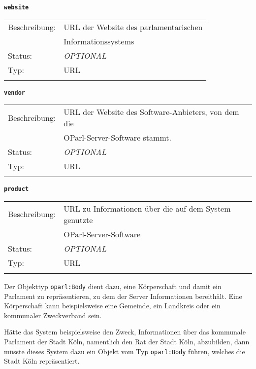 \documentclass[,a4paper]{article}
\begin{document}
\textbf{\texttt{website}}

\begin{longtable}[c]{@{}ll@{}}
\toprule\addlinespace
Beschreibung: & URL der Website des parlamentarischen
\\\addlinespace
& Informationssystems
\\\addlinespace
Status: & \emph{OPTIONAL}
\\\addlinespace
Typ: & URL
\\\addlinespace
\bottomrule
\end{longtable}

\textbf{\texttt{vendor}}

\begin{longtable}[c]{@{}ll@{}}
\toprule\addlinespace
Beschreibung: & URL der Website des Software-Anbieters, von dem die
\\\addlinespace
& OParl-Server-Software stammt.
\\\addlinespace
Status: & \emph{OPTIONAL}
\\\addlinespace
Typ: & URL
\\\addlinespace
\bottomrule
\end{longtable}

\textbf{\texttt{product}}

\begin{longtable}[c]{@{}ll@{}}
\toprule\addlinespace
Beschreibung: & URL zu Informationen über die auf dem System genutzte
\\\addlinespace
& OParl-Server-Software
\\\addlinespace
Status: & \emph{OPTIONAL}
\\\addlinespace
Typ: & URL
\\\addlinespace
\bottomrule
\end{longtable}


Der Objekttyp \texttt{oparl:Body} dient dazu, eine Körperschaft und
damit ein Parlament zu repräsentieren, zu dem der Server Informationen
bereithält. Eine Körperschaft kann beispielsweise eine Gemeinde, ein
Landkreis oder ein kommunaler Zweckverband sein.

Hätte das System beispielsweise den Zweck, Informationen über das
kommunale Parlament der Stadt Köln, namentlich den Rat der Stadt Köln,
abzubilden, dann müsste dieses System dazu ein Objekt vom Typ
\texttt{oparl:Body} führen, welches die Stadt Köln repräsentiert.
\end{document}
